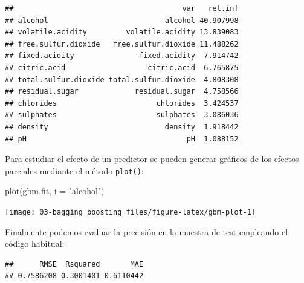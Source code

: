 \documentclass[
  spanish,
]{book}
\newenvironment{Shaded}{\begin{snugshade}}{\end{snugshade}}
\newcommand{\AttributeTok}[1]{\textcolor[rgb]{0.77,0.63,0.00}{#1}}
\newcommand{\CommentTok}[1]{\textcolor[rgb]{0.56,0.35,0.01}{\textit{#1}}}
\newcommand{\FunctionTok}[1]{\textcolor[rgb]{0.00,0.00,0.00}{#1}}
\newcommand{\NormalTok}[1]{#1}
\newcommand{\OtherTok}[1]{\textcolor[rgb]{0.56,0.35,0.01}{#1}}
\newcommand{\SpecialCharTok}[1]{\textcolor[rgb]{0.00,0.00,0.00}{#1}}
\newcommand{\StringTok}[1]{\textcolor[rgb]{0.31,0.60,0.02}{#1}}
\theoremstyle{break}
\theoremstyle{definition}
\theoremstyle{definition}
\theoremstyle{definition}
\theoremstyle{definition}
\theoremstyle{remark}
\begin{document}
\begin{verbatim}
##                                       var   rel.inf
## alcohol                           alcohol 40.907998
## volatile.acidity         volatile.acidity 13.839083
## free.sulfur.dioxide   free.sulfur.dioxide 11.488262
## fixed.acidity               fixed.acidity  7.914742
## citric.acid                   citric.acid  6.765875
## total.sulfur.dioxide total.sulfur.dioxide  4.808308
## residual.sugar             residual.sugar  4.758566
## chlorides                       chlorides  3.424537
## sulphates                       sulphates  3.086036
## density                           density  1.918442
## pH                                     pH  1.088152
\end{verbatim}

Para estudiar el efecto de un predictor se pueden generar gráficos de los efectos parciales mediante el método \texttt{plot()}:

\begin{Shaded}
\begin{Highlighting}[]
\FunctionTok{plot}\NormalTok{(gbm.fit, }\AttributeTok{i =} \StringTok{"alcohol"}\NormalTok{)}
\end{Highlighting}
\end{Shaded}

\begin{center}\texttt{[image: 03-bagging\_boosting\_files/figure-latex/gbm-plot-1]} \end{center}

Finalmente podemos evaluar la precisión en la muestra de test empleando el código habitual:

\begin{Shaded}
\end{Shaded}

\begin{verbatim}
##      RMSE  Rsquared       MAE 
## 0.7586208 0.3001401 0.6110442
\end{verbatim}
\end{document}
